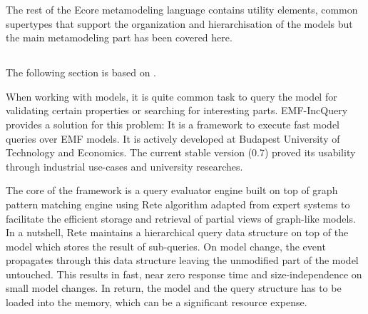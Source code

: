 The rest of the Ecore metamodeling language contains utility elements,
common supertypes that support the organization and hierarchisation of the
models but the main metamodeling part has been covered here.


\subsection{\eiq{}}
\label{subsec:eiq}

The following section is based on \cite{CsikosMasters}.





When working with models, it is quite common task to query the model for
validating certain properties or searching for interesting parts. EMF-IncQuery
\cite{EMFIncQuery} provides a solution for this problem: It is a framework to
execute fast model queries over EMF models. It is actively developed at Budapest
University of Technology and Economics. The current stable version (0.7) 
proved its usability through industrial use-cases
and university researches.

The core of the framework is a query evaluator engine built on top of graph
pattern matching engine using Rete algorithm adapted from expert
systems to facilitate the efficient storage and retrieval of partial views of
graph-like models. In a nutshell, Rete maintains a hierarchical query data
structure on top of the model which stores the result of sub-queries. On model
change, the event propagates through this data structure leaving the unmodified
part of the model untouched. This results in fast, near zero response time and
size-independence on small model changes. In return, the model and the query
structure has to be loaded into the memory, which can be a significant resource
expense.


